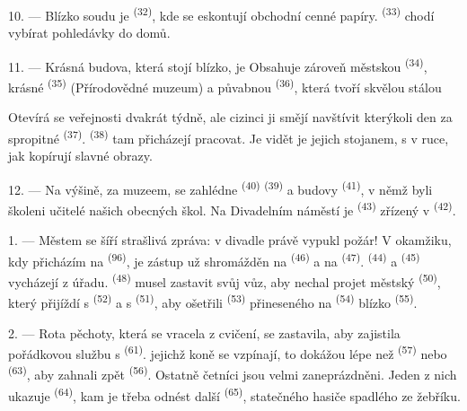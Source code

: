 10. --- Blízko soudu je  \textsuperscript{(32)}, kde se eskontují obchodní cenné
papíry.  \textsuperscript{(33)} chodí vybírat pohledávky do domů.

\VUsaut{4.0mm}
\VUsaut{3.4mm}

11. --- Krásná budova, která stojí blízko, je  Obsahuje zároveň městskou
 \textsuperscript{(34)}, krásné 
\textsuperscript{(35)} (Přírodovědné muzeum) a půvabnou 
\textsuperscript{(36)}, která tvoří skvělou stálou 

Otevírá se veřejnosti dvakrát týdně, ale cizinci ji smějí navštívit kterýkoli den za spropitné
 \textsuperscript{(37)}.  \textsuperscript{(38)} tam přicházejí
pracovat. Je vidět je  jejich stojanem, s  v ruce, jak kopírují
slavné obrazy.

12. --- Na výšině, za muzeem, se zahlédne  \textsuperscript{(40)}
 \textsuperscript{(39)} a budovy 
\textsuperscript{(41)}, v němž byli školeni učitelé našich obecných škol. Na Divadelním
náměstí je  \textsuperscript{(43)} zřízený v 
\textsuperscript{(42)}.

\VUsaut{5.0mm}
\VUsaut{3.0mm}

\VUsaut{3.4mm}

1. --- Městem se šíří strašlivá zpráva: v divadle právě vypukl požár! V okamžiku, kdy
přicházím na  \textsuperscript{(96)}, je zástup už shromážděn na
 \textsuperscript{(46)} a na  \textsuperscript{(47)}.
 \textsuperscript{(44)} a 
\textsuperscript{(45)} vycházejí z úřadu.  \textsuperscript{(48)} musel
zastavit svůj vůz, aby nechal projet městský
 \textsuperscript{(50)}, který přijíždí s 
\textsuperscript{(52)} a s  \textsuperscript{(51)}, aby ošetřili
 \textsuperscript{(53)} přineseného na 
\textsuperscript{(54)} blízko  \textsuperscript{(55)}.

2. --- Rota pěchoty, která se vracela z cvičení, se zastavila, aby zajistila pořádkovou službu
s  \textsuperscript{(61)}.
 jejichž koně se vzpínají, to dokážou lépe než 
\textsuperscript{(57)} nebo  \textsuperscript{(63)}, aby zahnali zpět
 \textsuperscript{(56)}. Ostatně četníci jsou velmi zaneprázdněni.
Jeden z nich ukazuje  \textsuperscript{(64)}, kam je třeba odnést další
 \textsuperscript{(65)}, statečného hasiče spadlého ze žebříku.

